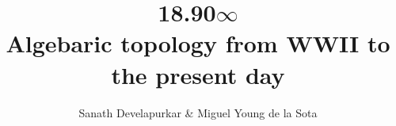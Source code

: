 \documentclass{report}
\begin{document}
\title{%
  18.90$\infty$ \\
    \large Algebaric topology from WWII to the present day%
}

\author{Sanath Develapurkar \& Miguel Young de la Sota}

\maketitle



\end{document}
